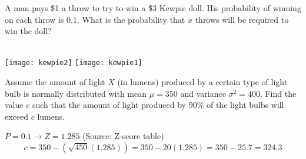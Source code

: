 \documentclass[answers]{exam}
\begin{document}
\begin{questions}
\question 
A man pays \$1 a throw to try to win a \$3 Kewpie doll. His probability of winning on each throw is 0.1. What is the probability that $x$ throws will be required to win the doll?
\begin{solution} \\
	\texttt{[image: kewpie2]}
	\hspace*{\fill}
	\hspace*{\fill}
	\texttt{[image: kewpie1]}
\end{solution}

\question 
Assume the amount of light $X$ (in lumens) produced by a certain type of light bulb is normally distributed with mean \(\mu=350\) and variance \(\sigma^2=400\). Find the value $c$ such that the amount of light produced by 90\% of the light bulbs will exceed $c$ lumens.
\begin{solution}
	\(P = 0.1 \rightarrow Z = 1.285\) (Source: Z-score table) \\
	\[c = 350 - (\sqrt{450}(1.285)) = 350 - 20(1.285) = 350 - 25.7 = 324.3\]
\end{solution}


\end{questions}
\end{document}

